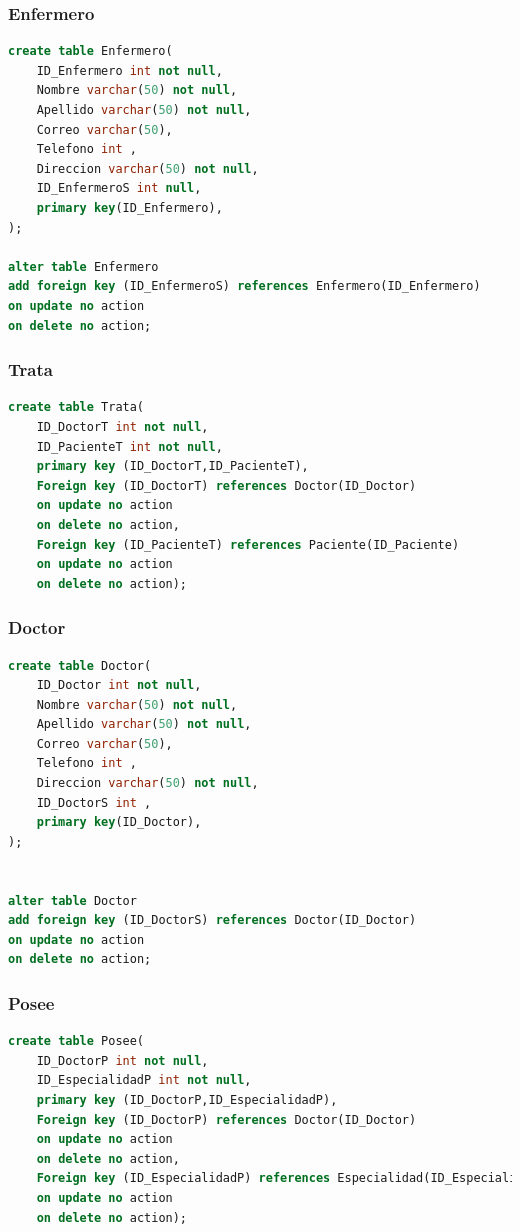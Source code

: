 \documentclass[10pt,letterpaper]{book}
\begin{document}
\subsubsection{Enfermero}
\begin{lstlisting}[language=sql]
create table Enfermero(
	ID_Enfermero int not null,
	Nombre varchar(50) not null,
	Apellido varchar(50) not null,
	Correo varchar(50),
	Telefono int ,
	Direccion varchar(50) not null,
	ID_EnfermeroS int null, 
	primary key(ID_Enfermero),
);

alter table Enfermero
add foreign key (ID_EnfermeroS) references Enfermero(ID_Enfermero)
on update no action
on delete no action;
\end{lstlisting}
\subsubsection{Trata}
\begin{lstlisting}[language=sql]
create table Trata(
	ID_DoctorT int not null,
	ID_PacienteT int not null,
	primary key (ID_DoctorT,ID_PacienteT),
	Foreign key (ID_DoctorT) references Doctor(ID_Doctor)
	on update no action
	on delete no action,
	Foreign key (ID_PacienteT) references Paciente(ID_Paciente)
	on update no action
	on delete no action);
\end{lstlisting}
\subsubsection{Doctor}
\begin{lstlisting}[language=sql]
create table Doctor(
	ID_Doctor int not null,
	Nombre varchar(50) not null,
	Apellido varchar(50) not null,
	Correo varchar(50),
	Telefono int ,
	Direccion varchar(50) not null,
	ID_DoctorS int ,
	primary key(ID_Doctor),
);


alter table Doctor
add foreign key (ID_DoctorS) references Doctor(ID_Doctor)
on update no action
on delete no action;
\end{lstlisting}
\subsubsection{Posee}
\begin{lstlisting}[language=sql]
create table Posee(
	ID_DoctorP int not null,
	ID_EspecialidadP int not null,
	primary key (ID_DoctorP,ID_EspecialidadP),
	Foreign key (ID_DoctorP) references Doctor(ID_Doctor)
	on update no action
	on delete no action,
	Foreign key (ID_EspecialidadP) references Especialidad(ID_Especialidad)
	on update no action
	on delete no action);
\end{lstlisting}
\end{document}
